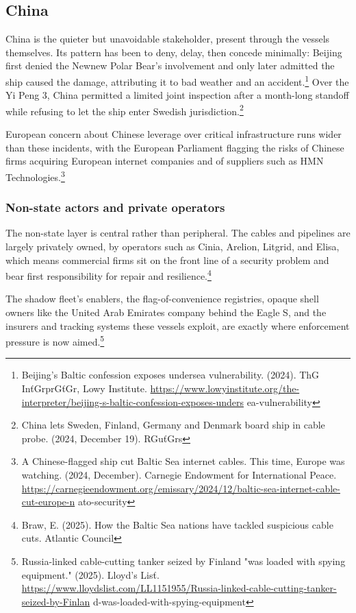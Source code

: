 \subsection{China}

China is the quieter but unavoidable stakeholder, present through the vessels themselves. Its pattern has been to deny, delay, then concede minimally: Beijing first denied the Newnew Polar Bear's involvement and only later admitted the ship caused the damage, attributing it to bad weather and an accident.\footnote{Beijing's Baltic confession exposes undersea vulnerability. (2024). ThG InťGrprGťGr, Lowy Institute. \url{https://www.lowyinstitute.org/the-interpreter/beijing-s-baltic-confession-exposes-unders} ea-vulnerability} Over the Yi Peng 3, China permitted a limited joint inspection after a month-long standoff while refusing to let the ship enter Swedish jurisdiction.\footnote{China lets Sweden, Finland, Germany and Denmark board ship in cable probe. (2024, December 19). RGuťGrs}

European concern about Chinese leverage over critical infrastructure runs wider than these incidents, with the European Parliament flagging the risks of Chinese firms acquiring European internet companies and of suppliers such as HMN Technologies.\footnote{A Chinese-flagged ship cut Baltic Sea internet cables. This time, Europe was watching. (2024, December). Carnegie Endowment for International Peace. \url{https://carnegieendowment.org/emissary/2024/12/baltic-sea-internet-cable-cut-europe-n} ato-security}

\subsubsection{Non-state actors and private operators}

The non-state layer is central rather than peripheral. The cables and pipelines are largely privately owned, by operators such as Cinia, Arelion, Litgrid, and Elisa, which means commercial firms sit on the front line of a security problem and bear first responsibility for repair and resilience.\footnote{Braw, E. (2025). How the Baltic Sea nations have tackled suspicious cable cuts. Atlantic Council}

The shadow fleet's enablers, the flag-of-convenience registries, opaque shell owners like the United Arab Emirates company behind the Eagle S, and the insurers and tracking systems these vessels exploit, are exactly where enforcement pressure is now aimed.\footnote{Russia-linked cable-cutting tanker seized by Finland "was loaded with spying equipment." (2025). Lloyd's Lisť. \url{https://www.lloydslist.com/LL1151955/Russia-linked-cable-cutting-tanker-seized-by-Finlan} d-was-loaded-with-spying-equipment}

